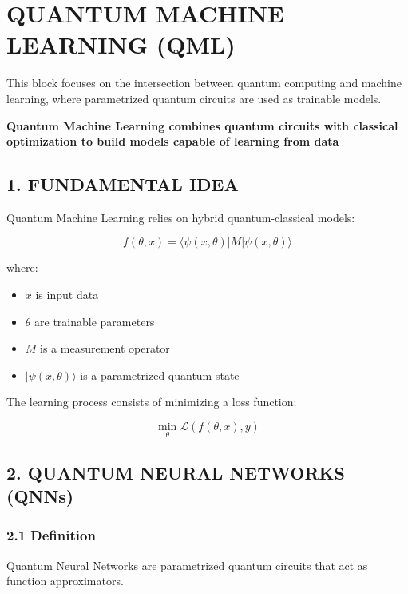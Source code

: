 \chapter{QUANTUM MACHINE LEARNING (QML)}

This block focuses on the intersection between quantum computing and machine learning, where parametrized quantum circuits are used as trainable models.

\begin{center}
\textbf{Quantum Machine Learning combines quantum circuits with classical optimization to build models capable of learning from data}
\end{center}

\vspace{0.5cm}

\section*{1. FUNDAMENTAL IDEA}

Quantum Machine Learning relies on hybrid quantum-classical models:

\[
f(\theta, x) = \langle \psi(x, \theta) | M | \psi(x, \theta) \rangle
\]

where:
\begin{itemize}
\item $x$ is input data
\item $\theta$ are trainable parameters
\item $M$ is a measurement operator
\item $|\psi(x, \theta)\rangle$ is a parametrized quantum state
\end{itemize}

The learning process consists of minimizing a loss function:

\[
\min_\theta \mathcal{L}(f(\theta, x), y)
\]

\vspace{0.5cm}

\section*{2. QUANTUM NEURAL NETWORKS (QNNs)}

\subsection*{2.1 Definition}

Quantum Neural Networks are parametrized quantum circuits that act as function approximators.

